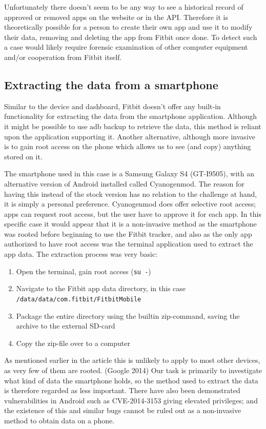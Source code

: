 \documentclass[a4paper,11pt,dvips]{article}
\begin{document}
Unfortunately there doesn't seem to be any way to see a historical record of approved or removed apps on the website or in the API. Therefore it is theoretically possible for a person to create their own app and use it to modify their data, removing and deleting the app from Fitbit once done. To detect such a case would likely require forensic examination of other computer equipment and/or cooperation from Fitbit itself.


\subsection{Extracting the data from a smartphone}

Similar to the device and dashboard, Fitbit doesn't offer any built-in functionality for extracting the data from the smartphone application. Although it might be possible to use adb backup to retrieve the data, this method is reliant upon the application supporting it. Another alternative, although more invasive is to gain root access on the phone which allows us to see (and copy) anything stored on it.

The smartphone used in this case is a Samsung Galaxy S4 (GT-I9505), with an alternative version of Android installed called Cyanogenmod. The reason for having this instead of the stock version has no relation to the challenge at hand, it is simply a personal preference. Cyanogenmod does offer selective root access; apps can request root access, but the user have to approve it for each app. In this specific case it would appear that it is a non-invasive method as the smartphone was rooted before beginning to use the Fitbit tracker, and also as the only app authorized to have root access was the terminal application used to extract the app data. The extraction process was very basic:

\begin{enumerate}
\item Open the terminal, gain root access (\texttt{su -})
\item Navigate to the Fitbit app data directory, in this case \\ \texttt{/data/data/com.fitbit/FitbitMobile}
\item Package the entire directory using the builtin zip-command, saving the archive to the external SD-card
\item Copy the zip-file over to a computer
\end{enumerate}

\noindent
As mentioned earlier in the article this is unlikely to apply to most other devices, as very few of them are rooted. (Google 2014) Our task is primarily to investigate what kind of data the smartphone holds, so the method used to extract the data is therefore regarded as less important. There have also been demonstrated vulnerabilities in Android such as CVE-2014-3153 giving elevated privileges; and the existence of this and similar bugs cannot be ruled out as a non-invasive method to obtain data on a phone.
\end{document}
